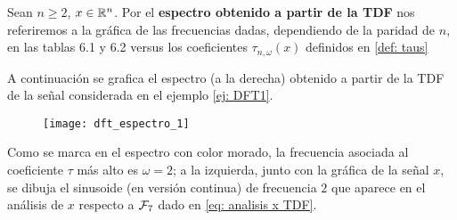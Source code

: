 \begin{defi}
\label{def: espectro DFT}
Sean $n \geq 2$,  $x \in \mathbb{R}^{n}$. Por el 
\textbf{espectro obtenido a partir de la TDF} nos referiremos
a la gráfica de las frecuencias dadas, dependiendo de la
paridad de $n$, en las tablas 
6.1 y 6.2
versus los coeficientes $\tau_{n, \omega}(x)$
definidos en \ref{def: taus}
\end{defi}

\begin{ejemplo}
A continuación se grafica el espectro
(a la derecha) obtenido
a partir de la TDF de la señal considerada en el 
ejemplo \ref{ej: DFT1}.

\begin{figure}[H]
	\centering
	\texttt{[image: dft\_espectro\_1]} 
\end{figure}	

Como se marca en el espectro con color morado, la frecuencia
asociada al coeficiente $\tau$ más alto es $\omega =2$; a la
izquierda, junto con la gráfica de la señal 
$x$, se dibuja el sinusoide (en versión continua)
de frecuencia $2$ que aparece en el análisis de
$x$ respecto a $\mathcal{F}_{7}$ dado en 
\eqref{eq: analisis x TDF}.
\final
\end{ejemplo}